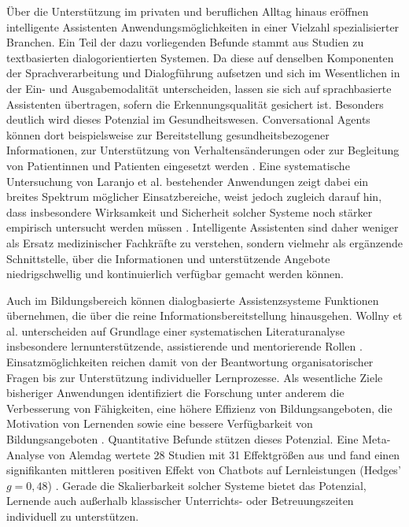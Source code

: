 Über die Unterstützung im privaten und beruflichen Alltag hinaus eröffnen intelligente Assistenten Anwendungsmöglichkeiten in einer Vielzahl spezialisierter Branchen. Ein Teil der dazu vorliegenden Befunde stammt aus Studien zu textbasierten dialogorientierten Systemen. Da diese auf denselben Komponenten der Sprachverarbeitung und Dialogführung aufsetzen und sich im Wesentlichen in der Ein- und Ausgabemodalität unterscheiden, lassen sie sich auf sprachbasierte Assistenten übertragen, sofern die Erkennungsqualität gesichert ist. Besonders deutlich wird dieses Potenzial im Gesundheitswesen. Conversational Agents können dort beispielsweise zur Bereitstellung gesundheitsbezogener Informationen, zur Unterstützung von Verhaltensänderungen oder zur Begleitung von Patientinnen und Patienten eingesetzt werden \cite{laranjo2018conversational}. Eine systematische Untersuchung von Laranjo et al. bestehender Anwendungen zeigt dabei ein breites Spektrum möglicher Einsatzbereiche, weist jedoch zugleich darauf hin, dass insbesondere Wirksamkeit und Sicherheit solcher Systeme noch stärker empirisch untersucht werden müssen \cite{laranjo2018conversational}. Intelligente Assistenten sind daher weniger als Ersatz medizinischer Fachkräfte zu verstehen, sondern vielmehr als ergänzende Schnittstelle, über die Informationen und unterstützende Angebote niedrigschwellig und kontinuierlich verfügbar gemacht werden können.

Auch im Bildungsbereich können dialogbasierte Assistenzsysteme Funktionen übernehmen, die über die reine Informationsbereitstellung hinausgehen. Wollny et al. unterscheiden auf Grundlage einer systematischen Literaturanalyse insbesondere lernunterstützende, assistierende und mentorierende Rollen \cite{wollny2021chatbots}. Einsatzmöglichkeiten reichen damit von der Beantwortung organisatorischer Fragen bis zur Unterstützung individueller Lernprozesse. Als wesentliche Ziele bisheriger Anwendungen identifiziert die Forschung unter anderem die Verbesserung von Fähigkeiten, eine höhere Effizienz von Bildungsangeboten, die Motivation von Lernenden sowie eine bessere Verfügbarkeit von Bildungsangeboten \cite{wollny2021chatbots}. Quantitative Befunde stützen dieses Potenzial. Eine Meta-Analyse von Alemdag wertete 28 Studien mit 31 Effektgrößen aus und fand einen signifikanten mittleren positiven Effekt von Chatbots auf Lernleistungen (Hedges' \(g = 0{,}48\)) \cite{alemdag2025chatbots}. Gerade die Skalierbarkeit solcher Systeme bietet das Potenzial, Lernende auch außerhalb klassischer Unterrichts- oder Betreuungszeiten individuell zu unterstützen.

